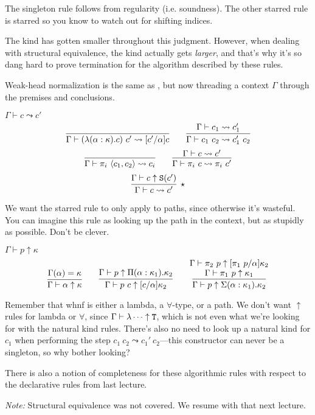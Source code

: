 The singleton rule follows from regularity (i.e. soundness). The other starred rule is starred
so you know to watch out for shifting indices.

The kind has gotten smaller throughout this judgment. However, when dealing with structural
equivalence, the kind actually gets \emph{larger}, and that's why it's so dang hard to prove
termination for the algorithm described by these rules.

Weak-head normalization is the same as , but now threading a context $\Gamma$
through the premises and conclusions.

\begin{judgment}
  $\Gamma \vdash c \leadsto c'$
  \[
    \infer{\Gamma \vdash (\lambda(\alpha : \kappa).c)~c' \leadsto [c'/\alpha]c}{}
    \qquad
    \infer{\Gamma \vdash c_1~c_2 \leadsto c_1'~c_2}{\Gamma \vdash c_1 \leadsto c_1'}
  \]
  \[
    \infer{\Gamma \vdash \pi_i~\langle c_1, c_2 \rangle \leadsto c_i}{}
    \qquad
    \infer{\Gamma \vdash \pi_i~c \leadsto \pi_i~c'}{\Gamma\vdash c \leadsto c'}
  \]
  \[
    \infer[\star]{\Gamma \vdash c \leadsto c'}{\Gamma \vdash c \uparrow \S(c')}
  \]
\end{judgment}

We want the starred rule to only apply to paths, since otherwise it's wasteful. You can
imagine this rule as looking up the path in the context, but as stupidly as possible. Don't
be clever.

\begin{judgment}
  $\Gamma \vdash p \uparrow \kappa$
  \[
    \infer{\Gamma \vdash \alpha \uparrow \kappa}{\Gamma(\alpha) = \kappa}
    \qquad
    \infer{\Gamma \vdash p~c \uparrow [c/\alpha]\kappa_2}
      {\Gamma \vdash p \uparrow \Pi(\alpha : \kappa_1).\kappa_2}
    \qquad
    \infer{\Gamma \vdash p \uparrow \Sigma(\alpha : \kappa_1).\kappa_2}
      {\deduce
        {\Gamma \vdash \pi_1~p \uparrow \kappa_1}
        {\Gamma \vdash \pi_2~p \uparrow [\pi_1~p/\alpha]\kappa_2}
      }
  \]
\end{judgment}

Remember that whnf is either a lambda, a $\forall$-type, or a path. We don't want $\uparrow$ rules
for lambda or $\forall$, since $\Gamma \vdash \lambda \cdots \uparrow \textnormal{\texttt{T}}$, which is not even
what we're looking for with the natural kind rules. There's also no need to look up
a natural kind for $c_1$ when performing the step $c_1~c_2 \leadsto c_1'~c_2$---this
constructor can never be a singleton, so why bother looking?

There is also a notion of completeness for these algorithmic rules with respect to the
declarative rules from last lecture.

\emph{Note:} Structural equivalence was not covered. We resume with that next lecture.
